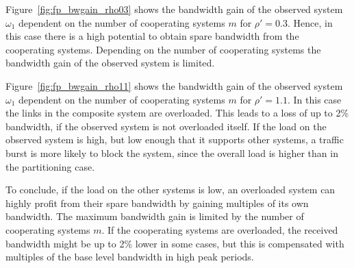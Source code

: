 Figure~\ref{fig:fp_bwgain_rho03} shows the bandwidth gain of the observed system $\omega_1$ dependent on the number of cooperating systems $m$ for $\rho'=0.3$.
Hence, in this case there is a high potential to obtain spare bandwidth from the cooperating systems.
Depending on the number of cooperating systems the bandwidth gain of the observed system is limited.

Figure~\ref{fig:fp_bwgain_rho11} shows the bandwidth gain of the observed system $\omega_1$ dependent on the number of cooperating systems $m$ for $\rho'=1.1$.
In this case the links in the composite system are overloaded.
This leads to a loss of up to 2\% bandwidth, if the observed system is not overloaded itself.
If the load on the observed system is high, but low enough that it supports other systems, a traffic burst is more likely to block the system, since the overall load is higher than in the partitioning case.

To conclude, if the load on the other systems is low, an overloaded system can highly profit from their spare bandwidth by gaining multiples of its own bandwidth. The maximum bandwidth gain is limited by the number of cooperating systems $m$.
If the cooperating systems are overloaded, the received bandwidth might be up to 2\% lower in some cases, but this is compensated with multiples of the base level bandwidth in high peak periods.


